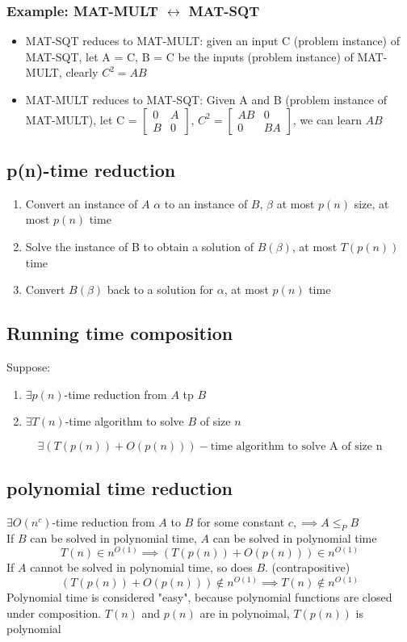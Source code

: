 \documentclass[9pt]{extarticle}
\begin{document}
\subsubsection*{Example: MAT-MULT $\leftrightarrow$ MAT-SQT}
\begin{itemize}
  \item MAT-SQT reduces to MAT-MULT: given an input C (problem instance) of MAT-SQT, let A = C, B = C be the inputs (problem instance) of MAT-MULT, clearly $C^2 = AB$
  \item MAT-MULT reduces to MAT-SQT: Given A and B (problem instance of MAT-MULT), let C = $\begin{bmatrix}
    0 & A\\ B & 0
  \end{bmatrix}$, $C^2 = \begin{bmatrix}
    AB & 0 \\ 0 & BA
  \end{bmatrix}$, we can learn $AB$
\end{itemize}

\subsection{p(n)-time reduction}
\begin{enumerate}
  \item Convert an instance of $A$ $\alpha$ to an instance of $B$, $\beta$ at most $p(n)$ size, at most $p(n)$ time
  \item Solve the instance of B to obtain a solution of $B(\beta)$, at most $T(p(n))$ time
  \item Convert $B(\beta)$ back to a solution for $\alpha$, at most $p(n)$ time
\end{enumerate}
\subsection{Running time composition}
Suppose: \begin{enumerate}
  \item $\exists p(n)$-time reduction from $A$ tp $B$
  \item $\exists T(n)$-time algorithm to solve $B$ of size $n$
\end{enumerate}
\[\exists \left(T(p(n)) + O(p(n))\right)-\text{time algorithm to solve A of size n}\]
\subsection{polynomial time reduction}
$\exists O(n^c)$-time reduction from $A$ to $B$ for some constant $c, \implies A \leq_P B$\\
If $B$ can be solved in polynomial time, $A$ can be solved in polynomial time
\[T(n) \in n^{O(1)} \implies \left(T(p(n)) + O(p(n))\right) \in n^{O(1)}\]
If $A$ cannot be solved in polynomial time, so does $B$. (contrapositive)
\[\left(T(p(n)) + O(p(n))\right) \notin n^{O(1)} \implies T(n) \notin n^{O(1)}\]
Polynomial time is considered "easy", because polynomial functions are closed under composition. $T(n)$ and $p(n)$
are in polynoimal, $T(p(n))$ is polynomial
\end{document}
